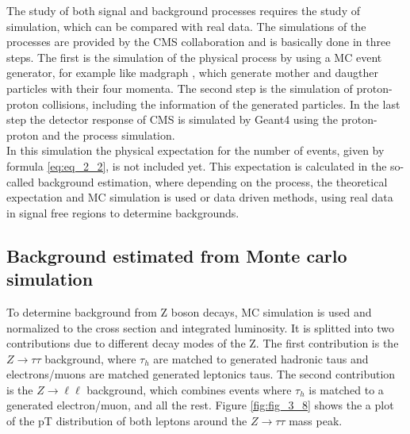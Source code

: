 The study of both signal and background processes requires the study of simulation, which can be compared with real data. The simulations of the processes are provided by the \gls{CMS} collaboration and is basically done in three steps. The first is the simulation of the physical process by using a \gls{MC} event generator, for example like madgraph \cite{MADGRAPH}, which generate mother and daugther particles with their four momenta. The second step is the simulation of proton-proton collisions, including the information of the generated particles. In the last step the detector response of \gls{CMS} is simulated by Geant4 \cite{GEANT4} using the proton-proton and the process simulation. \\

In this simulation the physical expectation for the number of events, given by formula \ref{eq:eq_2_2}, is not included yet. This expectation is calculated in the so-called background estimation, where depending on the process, the theoretical expectation and \gls{MC} simulation is used or data driven methods, using real data in signal free regions to determine backgrounds. 

\subsection{Background estimated from Monte carlo simulation}

To determine background from Z boson decays, MC simulation is used and normalized to the cross section and integrated luminosity. It is splitted into two contributions due to different decay modes of the Z. The first contribution is the $Z\to\tau\tau$ background, where $\tau_h$ are matched to generated hadronic taus and electrons/muons are matched generated leptonics taus. The second contribution is the $Z\to\ell\ell$ background, which combines events where $\tau_h$ is matched to a generated electron/muon, and all the rest. Figure \ref{fig:fig_3_8} shows the a plot of the \gls{pT} distribution of both leptons around the $Z\to\tau\tau$ mass peak. \\

